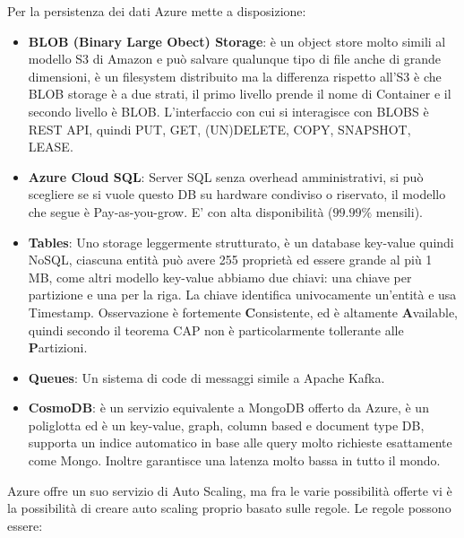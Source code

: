 \documentclass[11pt, twocolumn]{article}
\begin{document}
Per la persistenza dei dati Azure mette a disposizione:
\begin{itemize}[noitemsep, topsep=0ex, wide]
	\item \textbf{BLOB (Binary Large Obect) Storage}: è un object store molto simili al modello S3 di Amazon e può salvare qualunque tipo di file anche di grande dimensioni, è un filesystem distribuito ma la differenza rispetto all'S3 è che BLOB storage è a due strati, il primo livello prende il nome di Container e il secondo livello è BLOB.
	L'interfaccio con cui si interagisce con BLOBS è REST API, quindi PUT, GET, (UN)DELETE, COPY, SNAPSHOT, LEASE. 
	\item \textbf{Azure Cloud SQL}: Server SQL senza overhead amministrativi, si può scegliere se si vuole questo DB su hardware condiviso o riservato, il modello che segue è Pay-as-you-grow. 
	E' con alta disponibilità ($99.99\%$ mensili). 
	\item \textbf{Tables}: Uno storage leggermente strutturato, è un database key-value quindi NoSQL, ciascuna entità può avere 255 proprietà ed essere grande al più 1 MB, come altri modello key-value abbiamo due chiavi: una chiave per partizione e una per la riga. La chiave identifica univocamente un'entità e usa Timestamp.
	Osservazione è fortemente \textbf{C}onsistente, ed è altamente \textbf{A}vailable, quindi secondo il teorema CAP non è particolarmente tollerante alle \textbf{P}artizioni.
	\item \textbf{Queues}: Un sistema di code di messaggi simile a Apache Kafka.
	\item \textbf{CosmoDB}: è un servizio equivalente a MongoDB offerto da Azure, è un poliglotta ed è un key-value, graph, column based e document type DB, supporta un indice automatico in base alle query molto richieste esattamente come Mongo.
	Inoltre garantisce una latenza molto bassa in tutto il mondo.
\end{itemize}
Azure offre un suo servizio di Auto Scaling, ma fra le varie possibilità offerte vi è la possibilità di creare auto scaling proprio basato sulle regole. Le regole possono essere:
\end{document}
